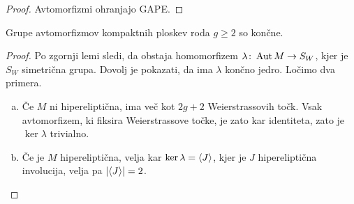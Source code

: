 \begin{proof}
Avtomorfizmi ohranjajo GAPE.
\end{proof}

\begin{izrek}[Schwarz]
Grupe avtomorfizmov kompaktnih ploskev roda $g \geq 2$ so končne.
\end{izrek}

\begin{proof}
Po zgornji lemi sledi, da obstaja homomorfizem
$\lambda \colon \operatorname{Aut} M \to S_W$, kjer je $S_W$ simetrična grupa.
Dovolj je pokazati, da ima $\lambda$ končno jedro. Ločimo dva
primera.

\begin{enumerate}[a)]
\item Če $M$ ni hipereliptična, ima več kot $2g + 2$
Weierstrassovih točk. Vsak avtomorfizem, ki fiksira Weierstrassove
točke, je zato kar identiteta, zato je $\ker \lambda$ trivialno.

\item Če je $M$ hipereliptična, velja kar
$\ker \lambda = \left\langle J\right\rangle$, kjer je $J$ hipereliptična involucija,
velja pa $\left\lvert \left\langle J\right\rangle\right\rvert = 2$. \qedhere
\end{enumerate}
\end{proof}

